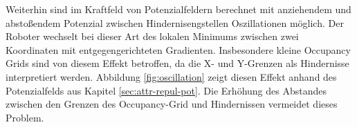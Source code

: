 Weiterhin sind im Kraftfeld von Potenzialfeldern berechnet mit anziehendem und abstoßendem Potenzial zwischen Hindernisengstellen Oszillationen möglich. Der Roboter wechselt bei dieser Art des lokalen Minimums zwischen zwei Koordinaten mit entgegengerichteten Gradienten.
Insbesondere kleine Occupancy Grids sind von diesem Effekt betroffen, da die X- und Y-Grenzen als Hindernisse interpretiert werden. Abbildung \ref{fig:oscillation} zeigt diesen Effekt anhand des Potenzialfelds aus Kapitel \ref{sec:attr-repul-pot}.
Die Erhöhung des Abstandes zwischen den Grenzen des Occupancy-Grid und Hindernissen vermeidet dieses Problem.
\begin{figure}[H]
	\footnotesize
	\centering
	\hspace*{\fill}
	\begin{minipage}{0.46\textwidth}%
		\centerline{}
	\end{minipage}
	\hspace*{\fill}
	\begin{minipage}{0.46\textwidth}%
		\footnotesize

\end{minipage}
\end{figure}

